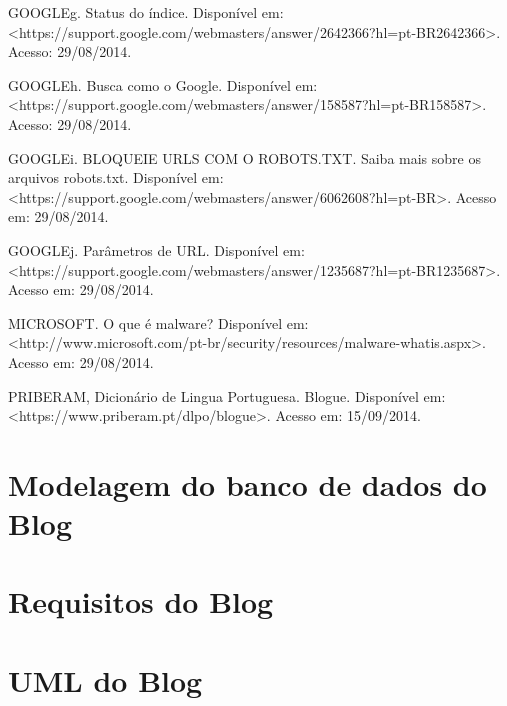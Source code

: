 \documentclass[
	12pt,				%
	openright,			%
	twoside,			%
	a4paper,			%
	english,			%
	french,				%
	spanish,			%
	brazil				%
	]{abntex2}
\begin{document}
GOOGLEg. Status do índice. Disponível em: <https://support.google.com/webmasters/answer/2642366?hl=pt-BR2642366>. Acesso: 29/08/2014.

GOOGLEh. Busca como o Google. Disponível em: <https://support.google.com/webmasters/answer/158587?hl=pt-BR158587>. Acesso: 29/08/2014.

GOOGLEi. BLOQUEIE URLS COM O ROBOTS.TXT. Saiba mais sobre os arquivos robots.txt. Disponível em: <https://support.google.com/webmasters/answer/6062608?hl=pt-BR>. Acesso em: 29/08/2014.

GOOGLEj. Parâmetros de URL. Disponível em: <https://support.google.com/webmasters/answer/1235687?hl=pt-BR1235687>. Acesso em: 29/08/2014.

MICROSOFT. O que é malware? Disponível em: <http://www.microsoft.com/pt-br/security/resources/malware-whatis.aspx>. Acesso em: 29/08/2014.

PRIBERAM, Dicionário de Lingua Portuguesa. Blogue. Disponível em: <https://www.priberam.pt/dlpo/blogue>. Acesso em: 15/09/2014.


%
%



\begin{anexosenv}

\partanexos

\chapter{Modelagem do banco de dados do Blog}

\chapter{Requisitos do Blog}

\chapter{UML do Blog}

\end{anexosenv}

\printindex
\end{document}
